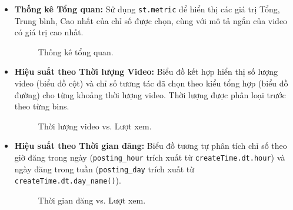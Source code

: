 \begin{itemize}
    \item \textbf{Thống kê Tổng quan:} Sử dụng \texttt{st.metric} để hiển thị các giá trị Tổng, Trung bình, Cao nhất của chỉ số được chọn, cùng với mô tả ngắn của video có giá trị cao nhất.
    \begin{figure}[H]
        \centering
        \caption{Thống kê tổng quan.}
    \end{figure}

    \item \textbf{Hiệu suất theo Thời lượng Video:} Biểu đồ kết hợp hiển thị số lượng video (biểu đồ cột) và chỉ số tương tác đã chọn theo kiểu tổng hợp (biểu đồ đường) cho từng khoảng thời lượng video. Thời lượng được phân loại trước theo từng bins.
    \begin{figure}[H]
        \centering
        \caption{Thời lượng video vs. Lượt xem.}
    \end{figure}
    
    \item \textbf{Hiệu suất theo Thời gian đăng:} Biểu đồ tương tự phân tích chỉ số theo giờ đăng trong ngày (\texttt{posting\_hour} trích xuất từ \texttt{createTime.dt.hour}) và ngày đăng trong tuần (\texttt{posting\_day} trích xuất từ \texttt{createTime.dt.day\_name()}).
    \begin{figure}[H]
        \centering
        \caption{Thời gian đăng vs. Lượt xem.}
    \end{figure}
    

\end{itemize}
